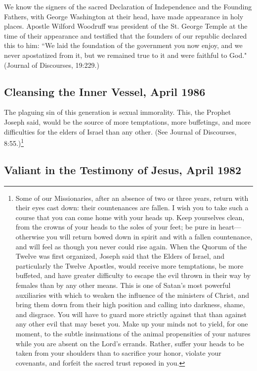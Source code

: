 We know the signers of the sacred Declaration of Independence and the Founding Fathers, with George Washington at their head, have made appearance in holy places. Apostle Wilford Woodruff was president of the St. George Temple at the time of their appearance and testified that the founders of our republic declared this to him: ``We laid the foundation of the government you now enjoy, and we never apostatized from it, but we remained true to it and were faithful to God." (Journal of Discourses, 19:229.)

\subsection{Cleansing the Inner Vessel, April 1986}

The plaguing sin of this generation is sexual immorality. This, the Prophet Joseph said, would be the source of more temptations, more buffetings, and more difficulties for the elders of Israel than any other. (See Journal of Discourses, 8:55.)\footnote{Some of our Missionaries, after an absence of two or three years, return with their eyes cast down: their countenances are fallen. I wish you to take such a course that you can come home with your heads up. Keep yourselves clean, from the crowns of your heads to the soles of your feet; be pure in heart—otherwise you will return bowed down in spirit and with a fallen countenance, and will feel as though you never could rise again. When the Quorum of the Twelve was first organized, Joseph said that the Elders of Israel, and particularly the Twelve Apostles, would receive more temptations, be more buffeted, and have greater difficulty to escape the evil thrown in their way by females than by any other means. This is one of Satan's most powerful auxiliaries with which to weaken the influence of the ministers of Christ, and bring them down from their high position and calling into darkness, shame, and disgrace. You will have to guard more strictly against that than against any other evil that may beset you. Make up your minds not to yield, for one moment, to the subtle insinuations of the animal propensities of your natures while you are absent on the Lord's errands. Rather, suffer your heads to be taken from your shoulders than to sacrifice your honor, violate your covenants, and forfeit the sacred trust reposed in you.}

\subsection{Valiant in the Testimony of Jesus, April 1982}

